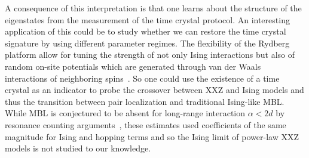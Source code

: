A consequence of this interpretation is that one learns about the structure of the eigenstates from the measurement of the time crystal protocol. An interesting application of this could be to study whether we can restore the time crystal signature by using different parameter regimes. The flexibility of the Rydberg platform allow for tuning the strength of not only Ising interactions but also of random on-site potentials which are generated through van der Waals interactions of neighboring spins~\cite{wuProgrammableOrderDisorder2024}. So one could use the existence of a time crystal as an indicator to probe the crossover between XXZ and Ising models and thus the transition between pair localization and traditional Ising-like MBL. While MBL is conjectured to be absent for long-range interaction $\alpha < 2d$ by resonance counting arguments~\cite{yaoManyBodyLocalizationDipolar2014,burinLocalizationRandomXY2015}, these estimates used coefficients of the same magnitude for Ising and hopping terms and so the Ising limit of power-law XXZ models is not studied to our knowledge.
%
%
